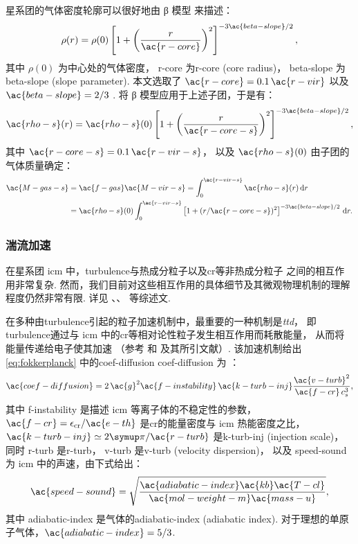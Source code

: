 星系团的气体密度轮廓可以很好地由 β 模型 \cite{cavaliere1976} 来描述：
\begin{equation}
  \label{eq:beta-model}
  \rho(r)
    = \rho(0) \left[ 1 + \left(
      \frac{r}{\ac{r-core}} \right)^2 \right]^{-3\ac{beta-slope}/2} ,
\end{equation}
其中
$\rho(0)$ 为中心处的气体密度，
\ac{r-core} 为\acl{r-core} (core radius)，
\ac{beta-slope} 为\acl{beta-slope} (slope parameter).
本文选取了 $\ac{r-core} = 0.1 \,\ac{r-vir}$ \cite{sanderson2003}
以及 $\ac{beta-slope} = 2/3$ \cite{jones1984}.
将 β 模型应用于上述子团，于是有：
\begin{equation}
  \ac{rho-s}(r)
    = \ac{rho-s}(0) \left[ 1 + \left(
      \frac{r}{\ac{r-core-s}} \right)^2 \right]^{-3\ac{beta-slope}/2} ,
\end{equation}
其中
$\ac{r-core-s} = 0.1 \,\ac{r-vir-s}$，
以及 $\ac{rho-s}(0)$ 由子团的气体质量确定：
\begin{align}
  \ac{M-gas-s}
    & = \ac{f-gas} \ac{M-vir-s}
      = \int_0^{\ac{r-vir-s}} \ac{rho-s}(r) \,\D{r}  \\
    & = \ac{rho-s}(0) \int_0^{\ac{r-vir-s}}
        \left[ 1 + (r / \ac{r-core-s})^2 \right]^{-3\ac{beta-slope}/2}
        \,\D{r} .
\end{align}

\subsubsection{湍流加速}

在星系团 \ac{icm} 中，\ac{turbulence}与热成分粒子以及\ac{cr}等非热成分粒子
之间的相互作用非常复杂.
然而，我们目前对这些相互作用的具体细节及其微观物理机制的理解程度仍然非常有限.
详见 、、
 等综述文.

在多种由\ac{turbulence}引起的粒子加速机制中，最重要的一种机制是\emph{\acf{ttd}}，
即\ac{turbulence}通过与 \ac{icm} 中的\ac{cr}等相对论性粒子发生相互作用而耗散能量，
从而将能量传递给电子使其加速
（参考  和  及其所引文献）.
该加速机制给出\autoref{eq:fokkerplanck}
中的\acl{coef-diffusion} \ac{coef-diffusion} 为
\cite{miniati2015,pinzke2017}：
\begin{equation}
  \ac{coef-diffusion}
    = 2\,\ac{g}^2 \ac{f-instability} \,\ac{k-turb-inj}
      \frac{\ac{v-turb}^2}{\ac{f-cr} \,c_s^3} ,
\end{equation}
其中
\ac{f-instability} 是描述 \ac{icm} 等离子体的不稳定性的参数，
$\ac{f-cr} = \epsilon_{\R{cr}} / \ac{e-th}$
是\ac{cr}的能量密度与 \ac{icm} 热能密度之比，
$\ac{k-turb-inj} \simeq 2\Cpi / \ac{r-turb}$
是\acl{k-turb-inj} (injection scale)，
同时 \ac{r-turb} 是\acl{r-turb}，
\ac{v-turb} 是\acl{v-turb} (velocity dispersion)，
以及 \ac{speed-sound} 为 \ac{icm} 中的声速，由下式给出：
\begin{equation}
  \ac{speed-sound}
    = \sqrt{\frac{\ac{adiabatic-index} \ac{kb} \ac{T-cl}}{
        \ac{mol-weight-m} \ac{mass-u}}} ,
\end{equation}
其中 \ac{adiabatic-index} 是气体的\acl{adiabatic-index} (adiabatic index).
对于理想的单原子气体，$\ac{adiabatic-index} = 5/3$.

